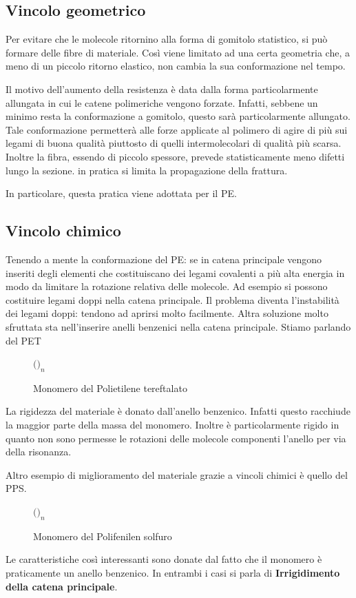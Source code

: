 \subsection{Vincolo geometrico}
Per evitare che le molecole ritornino alla forma di gomitolo statistico, si può formare delle fibre di materiale. Così viene limitato ad una certa geometria che, a meno di un piccolo ritorno elastico, non cambia la sua conformazione nel tempo.

Il motivo dell'aumento della resistenza è data dalla forma particolarmente allungata in cui le catene polimeriche vengono forzate.
Infatti, sebbene un minimo resta la conformazione a gomitolo, questo sarà particolarmente allungato. Tale conformazione permetterà alle forze applicate al polimero di agire di più sui legami di buona qualità piuttosto di quelli intermolecolari di qualità più scarsa.
Inoltre la fibra, essendo di piccolo spessore, prevede statisticamente meno difetti lungo la sezione. in pratica si limita la propagazione della frattura.

In particolare, questa pratica viene adottata per il \ac{PE}.

\subsection{Vincolo chimico}
Tenendo a mente la conformazione del \ac{PE}: se in catena principale vengono inseriti degli elementi che costituiscano dei legami covalenti a più alta energia in modo da limitare la rotazione relativa delle molecole.
Ad esempio si possono costituire legami doppi nella catena principale.
Il problema diventa l'instabilità dei legami doppi: tendono ad aprirsi molto facilmente.
Altra soluzione molto sfruttata sta nell'inserire anelli benzenici nella catena principale.
Stiamo parlando del \ac{PET}

\begin{figure}
\centering
$\Big($$\Big)_n$
\caption{Monomero del Polietilene tereftalato}
\label{fig:PET}
\end{figure}

La rigidezza del materiale è donato dall'anello benzenico. Infatti questo racchiude la maggior parte della massa del monomero. Inoltre è particolarmente rigido in quanto non sono permesse le rotazioni delle molecole componenti l'anello per via della risonanza.

Altro esempio di miglioramento del materiale grazie a vincoli chimici è quello del \ac{PPS}.
\begin{figure}
\centering
$\Big($$\Big)_n$
\caption{Monomero del Polifenilen solfuro}
\label{fig:PPS}
\end{figure}
Le caratteristiche così interessanti sono donate dal fatto che il monomero è praticamente un anello benzenico.
In entrambi i casi si parla di \textbf{Irrigidimento della catena principale}.

